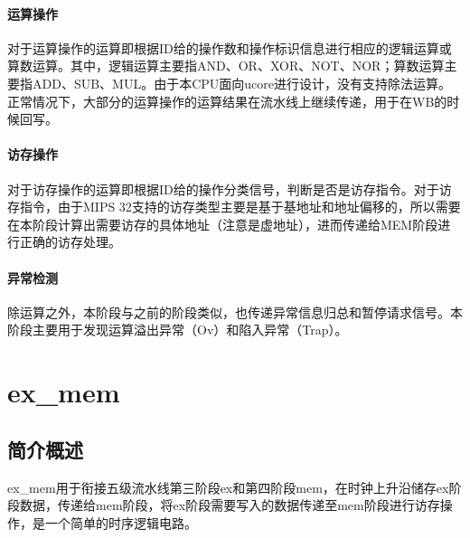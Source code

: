         \paragraph{运算操作}
        对于运算操作的运算即根据ID给的操作数和操作标识信息进行相应的逻辑运算或算数运算。其中，逻辑运算主要指AND、OR、XOR、NOT、NOR；算数运算主要指ADD、SUB、MUL。由于本CPU面向ucore进行设计，没有支持除法运算。正常情况下，大部分的运算操作的运算结果在流水线上继续传递，用于在WB的时候回写。

        \paragraph{访存操作}
        对于访存操作的运算即根据ID给的操作分类信号，判断是否是访存指令。对于访存指令，由于MIPS 32支持的访存类型主要是基于基地址和地址偏移的，所以需要在本阶段计算出需要访存的具体地址（注意是虚地址），进而传递给MEM阶段进行正确的访存处理。

        \paragraph{异常检测}
        除运算之外，本阶段与之前的阶段类似，也传递异常信息归总和暂停请求信号。本阶段主要用于发现运算溢出异常（Ov）和陷入异常（Trap）。

\section{ex\_mem}

    \subsection{简介概述}
    ex\_mem用于衔接五级流水线第三阶段ex和第四阶段mem，在时钟上升沿储存ex阶段数据，传递给mem阶段，将ex阶段需要写入的数据传递至mem阶段进行访存操作，是一个简单的时序逻辑电路。


